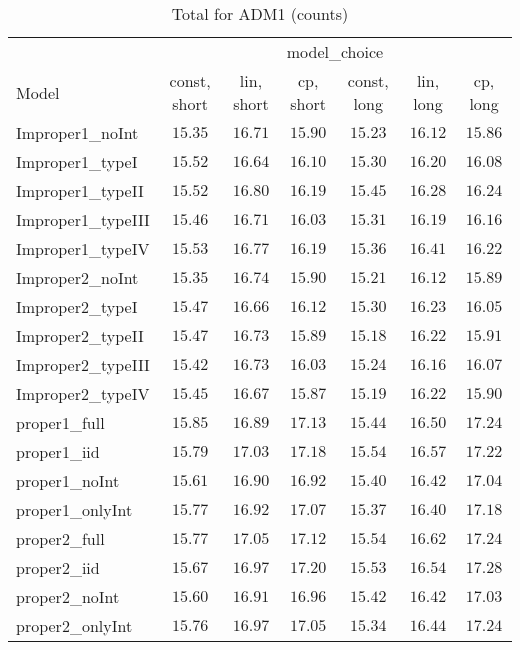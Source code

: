 \begin{table}

\caption{\label{tab:model-choice-sc11}Total for ADM1 (counts)}
\centering
\begin{tabular}{lcccccc}
\hline
 & \multicolumn{6}{c}{model_choice} \\ 
Model  & const, short & lin, short & cp, short & const, long & lin, long & \multicolumn{1}{c}{cp, long} \\ 
\hline
Improper1_noInt  & $15.35$ & $16.71$ & $15.90$ & $15.23$ & $16.12$ & $15.86$ \\
Improper1_typeI  & $15.52$ & $16.64$ & $16.10$ & $15.30$ & $16.20$ & $16.08$ \\
Improper1_typeII  & $15.52$ & $16.80$ & $16.19$ & $15.45$ & $16.28$ & $16.24$ \\
Improper1_typeIII  & $15.46$ & $16.71$ & $16.03$ & $15.31$ & $16.19$ & $16.16$ \\
Improper1_typeIV  & $15.53$ & $16.77$ & $16.19$ & $15.36$ & $16.41$ & $16.22$ \\
Improper2_noInt  & $15.35$ & $16.74$ & $15.90$ & $15.21$ & $16.12$ & $15.89$ \\
Improper2_typeI  & $15.47$ & $16.66$ & $16.12$ & $15.30$ & $16.23$ & $16.05$ \\
Improper2_typeII  & $15.47$ & $16.73$ & $15.89$ & $15.18$ & $16.22$ & $15.91$ \\
Improper2_typeIII  & $15.42$ & $16.73$ & $16.03$ & $15.24$ & $16.16$ & $16.07$ \\
Improper2_typeIV  & $15.45$ & $16.67$ & $15.87$ & $15.19$ & $16.22$ & $15.90$ \\
proper1_full  & $15.85$ & $16.89$ & $17.13$ & $15.44$ & $16.50$ & $17.24$ \\
proper1_iid  & $15.79$ & $17.03$ & $17.18$ & $15.54$ & $16.57$ & $17.22$ \\
proper1_noInt  & $15.61$ & $16.90$ & $16.92$ & $15.40$ & $16.42$ & $17.04$ \\
proper1_onlyInt  & $15.77$ & $16.92$ & $17.07$ & $15.37$ & $16.40$ & $17.18$ \\
proper2_full  & $15.77$ & $17.05$ & $17.12$ & $15.54$ & $16.62$ & $17.24$ \\
proper2_iid  & $15.67$ & $16.97$ & $17.20$ & $15.53$ & $16.54$ & $17.28$ \\
proper2_noInt  & $15.60$ & $16.91$ & $16.96$ & $15.42$ & $16.42$ & $17.03$ \\
proper2_onlyInt  & $15.76$ & $16.97$ & $17.05$ & $15.34$ & $16.44$ & $17.24$ \\
\hline 
\end{tabular}


\end{table}